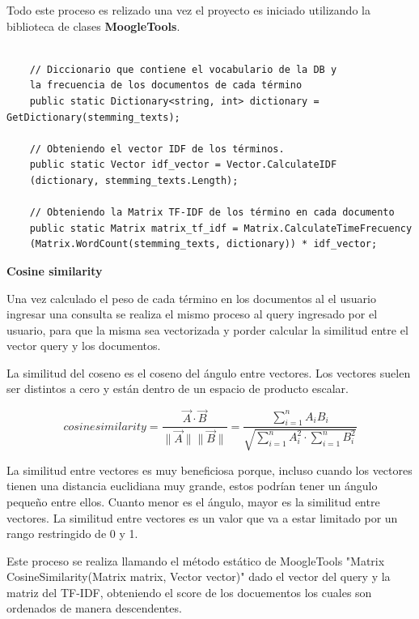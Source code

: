 \documentclass[a4paper,12pt]{article}
\begin{document}
	Todo este proceso es relizado una vez el proyecto es iniciado utilizando la biblioteca de clases \textbf{MoogleTools}.
	
	\begin{verbatim}
	
	// Diccionario que contiene el vocabulario de la DB y 
	la frecuencia de los documentos de cada término
	public static Dictionary<string, int> dictionary = GetDictionary(stemming_texts);
	
	// Obteniendo el vector IDF de los términos.
	public static Vector idf_vector = Vector.CalculateIDF
	(dictionary, stemming_texts.Length);
	
	// Obteniendo la Matrix TF-IDF de los término en cada documento
	public static Matrix matrix_tf_idf = Matrix.CalculateTimeFrecuency
	(Matrix.WordCount(stemming_texts, dictionary)) * idf_vector;
	\end{verbatim}
		
	\vspace{0.50cm}	
	\textbf {Cosine similarity}
	
	Una vez calculado el peso de cada término en los documentos al el usuario ingresar una consulta se realiza el mismo proceso al query ingresado por el usuario, para que la misma sea vectorizada y porder calcular la similitud entre el vector query y los documentos.
	
	La similitud del coseno es el coseno del ángulo entre vectores. Los vectores suelen ser distintos a cero y están dentro de un espacio de producto escalar.
	
	\begin{center}
		\begin{equation}
			cosine similarity = \frac{\vec{A} \cdot \vec{B}}{\|\vec{A} \| \|\vec{B}\|} = \frac{\sum_{i = 1}^{n} A_i B_i}{\sqrt{\sum_{i = 1}^{n} A_i^2 \cdot \sum_{i = 1}^{n} B_i^2}}
		\end{equation}
	\end{center}
	
	La similitud entre vectores es muy beneficiosa porque, incluso cuando los vectores tienen una distancia euclidiana muy grande, estos podrían tener un ángulo pequeño entre ellos. Cuanto menor es el ángulo, mayor es la similitud entre vectores. La similitud entre vectores es un valor que va a estar limitado por un rango restringido de 0 y 1.
	
	Este proceso se realiza llamando el método estático de MoogleTools "Matrix CosineSimilarity(Matrix matrix, Vector vector)" dado el vector del query y la matriz del TF-IDF, obteniendo el score de los docuementos los cuales son ordenados de manera descendentes.
	
\end{document}
